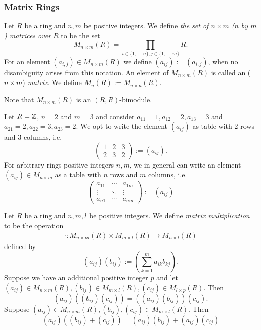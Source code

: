 \subsubsection{Matrix Rings}
\begin{definition}
    Let $R$ be a ring and $n,m$ be positive integers. We define \textit{the set of $n\times m$ ($n$ by $m$) matrices over $R$} to be the set 
    $$M_{n\times m}(R) = \prod_{i\in \{1,\dots,n\}, j\in \{1,\dots,m\}} R.$$
    For an element $(a_{i,j})\in M_{n\times m}(R)$ we define $(a_{ij}):= (a_{i,j})$, when no disambiguity arises from this notation. An element of $M_{n\times m}(R)$ is called an ($n\times m$) \textit{matrix}. We define $M_n(R):= M_{n\times n}(R)$. 
\end{definition}
\begin{remark}\label{SetOfMatricesIsAnAdditiveGroup}
    Note that $M_{n\times m}(R)$ is an $(R,R)$-bimodule.
\end{remark}
\begin{example}
    Let $R= \mathbb{Z}$, $n = 2$ and $m = 3$ and consider $a_{11} = 1, a_{12} = 2, a_{13}=3$ and $a_{21} = 2, a_{22} = 3, a_{23} = 2$. We opt to write the element $(a_{ij})$ as table with $2$ rows and $3$ columns, i.e.
    $$\begin{pmatrix}
        1 & 2 & 3\\
        2 & 3 & 2
    \end{pmatrix} := (a_{ij}).$$
    For arbitrary rings positive integers $n,m$, we in general can write an element $(a_{ij})\in M_{n\times m}$ as a table with $n$ rows and $m$ columns, i.e.
    $$\begin{pmatrix}
        a_{11} & \cdots & a_{1m}\\
        \vdots & \ddots & \vdots\\
        a_{n1} & \cdots & a_{nm}
    \end{pmatrix} := (a_{ij})$$
\end{example}
\begin{lemma}\label{MatrixMultiplicationIsAssociativeAndDistributesOverAddition}
    Let $R$ be a ring and $n,m,l$ be positive integers. We define \textit{matrix multiplication} to be the operation 
    \begin{gather*}
        \cdot : M_{n\times m}(R) \times M_{m\times l}(R) \rightarrow M_{n\times l}(R)
    \end{gather*}
    defined by 
    $$(a_{ij})(b_{ij}) := \left(\sum_{k=1}^m a_{ik}b_{kj}\right).$$
    Suppose we have an additional positive integer $p$ and let $(a_{ij})\in M_{n\times m}(R),(b_{ij}) \in M_{m\times l}(R), (c_{ij})\in M_{l\times p}(R).$
    Then 
    $$(a_{ij})\left((b_{ij})(c_{ij})\right) =  \left((a_{ij})(b_{ij})\right)(c_{ij}). $$
    Suppose $(a_{ij})\in M_{n\times m}(R),(b_{ij}), (c_{ij})\in M_{m\times l}(R)$. Then 
    $$(a_{ij})\left((b_{ij})+(c_{ij})\right) = (a_{ij})(b_{ij}) + (a_{ij})(c_{ij})$$
\end{lemma}
